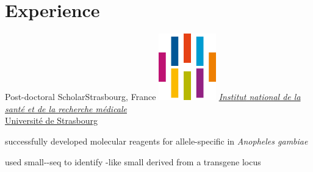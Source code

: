 \documentclass[letterpaper]{twentysecond-charactersheet}
\begin{document}
\makesidebar


\vspace{46pt}

\section{Experience}


%
	{Post-doctoral Scholar}{Strasbourg, France}%
	{\includegraphics[width=\logowidth]{img/INSERM.png}}%
	{\href{http://www-ibmc.u-strasbg.fr/}{\emph{Institut national de la sant\'{e} et de la recherche m\'{e}dicale} \\Universit\'{e} de Strasbourg}}%
	{\begin{itemize}
			{\item[\color{gold}\faStar] successfully developed molecular reagents for allele-specific  in \emph{Anopheles gambiae}}
		\end{itemize}
		\begin{itemize}
			{\item[\color{gold}\faStar] used small--seq to identify -like small  derived from a transgene locus}
		\end{itemize}
	}
\end{document}
